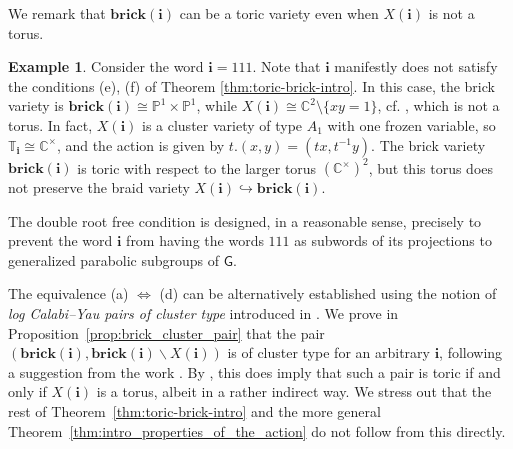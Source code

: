 \documentclass[a4paper, 11pt]{amsart}
\newcommand{\brick}{\mathbf{brick}}
\newcommand{\word}[1]{\mathbf{#1}}
\newcommand{\group}{\mathsf{G}}
\newcommand{\C}{\mathbb{C}}
\newcommand{\dil}[1]{\mathbb{T}_{#1}}
\theoremstyle{definition}
\newtheorem{example}[theorem]{Example}
\begin{document}
We remark that $\brick(\word{i})$ can be a toric variety even when $X(\word{i})$ is not a torus.

\begin{example}
\label{ex:intro_111}
    Consider the word $\word{i} = 111$. Note that $\word{i}$ manifestly does not satisfy the conditions (e), (f) of Theorem \ref{thm:toric-brick-intro}. In this case, the brick variety is $\brick({\word{i}}) \cong \mathbb{P}^1 \times \mathbb{P}^1$, while $X(\word{i}) \cong \C^2 \setminus \{xy = 1\}$, cf. \cite[Example 4.16]{CGGS2}, which is not a torus. In fact, $X(\word{i})$ is a cluster variety of type $A_1$ with one frozen variable, so $\dil{\word{i}} \cong \C^{\times}$, and the action is given by $t.(x,y) = (tx, t^{-1}y)$. The brick variety $\brick(\word{i})$ is toric with respect to the larger torus $(\C^{\times})^{2}$, but this torus does not preserve the braid variety $X(\word{i}) \hookrightarrow \brick(\word{i})$. 
\end{example}

The double root free condition is designed, in a reasonable sense, precisely to prevent the word $\word{i}$ from having the words $111$ as subwords of its projections to generalized parabolic subgroups of $\group$.

\bigskip

The equivalence (a) $\Longleftrightarrow$ (d) can be alternatively established using the notion of \emph{log Calabi--Yau pairs of cluster type} introduced in \cite{EFM}. We prove in Proposition~\ref{prop:brick_cluster_pair} that 
the pair $(\brick(\word{i}), \brick(\word{i}) \backslash X(\word{i}))$ is of cluster type for an arbitrary $\word{i}$, following a suggestion from the work \cite{EFMS}. By \cite[Theorem 1.10]{EFM}, this does imply that such a pair is toric if and only if $X(\word{i})$ is a torus, albeit in a rather indirect way. We stress out that the rest of Theorem~\ref{thm:toric-brick-intro} and the more general Theorem~\ref{thm:intro_properties_of_the_action} do not follow from this directly.

\bigskip
\end{document}
